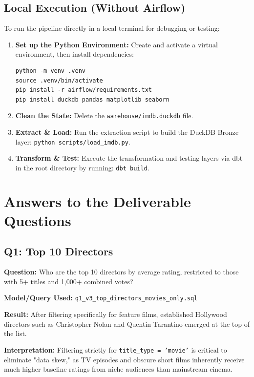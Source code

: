 \documentclass[runningheads]{llncs}
\begin{document}
\subsection{Local Execution (Without Airflow)}
To run the pipeline directly in a local terminal for debugging or testing:
\begin{enumerate}
    \item \textbf{Set up the Python Environment:} Create and activate a virtual environment, then install dependencies:
    \begin{verbatim}
python -m venv .venv
source .venv/bin/activate
pip install -r airflow/requirements.txt
pip install duckdb pandas matplotlib seaborn
    \end{verbatim}
    \item \textbf{Clean the State:} Delete the \texttt{warehouse/imdb.duckdb} file.
    \item \textbf{Extract \& Load:} Run the extraction script to build the DuckDB Bronze layer: \texttt{python scripts/load\_imdb.py}.
    \item \textbf{Transform \& Test:} Execute the transformation and testing layers via dbt in the root directory by running: \texttt{dbt build}.
\end{enumerate}

\section{Answers to the Deliverable Questions}

\subsection{Q1: Top 10 Directors}
\textbf{Question:} Who are the top 10 directors by average rating, restricted to those with 5+ titles and 1,000+ combined votes?

\noindent\textbf{Model/Query Used:} \texttt{q1\_v3\_top\_directors\_movies\_only.sql}

\noindent\textbf{Result:} After filtering specifically for feature films, established Hollywood directors such as Christopher Nolan and Quentin Tarantino emerged at the top of the list.

\noindent\textbf{Interpretation:} Filtering strictly for \texttt{title\_type = 'movie'} is critical to eliminate "data skew," as TV episodes and obscure short films inherently receive much higher baseline ratings from niche audiences than mainstream cinema.
\end{document}
